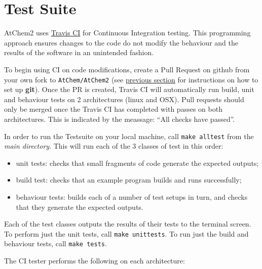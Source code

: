 \section{Test Suite} \label{sec:testsuite}

AtChem2 uses \href{https://travis-ci.org/}{Travis CI} for Continuous
Integration testing. This programming approach ensures changes to the
code do not modify the behaviour and the results of the software in an
unintended fashion.

To begin using CI on code modifications, create a Pull Request on
github from your own fork to \texttt{AtChem/AtChem2} (see
\hyperref[sec:information]{previous section} for instructions on how
to set up \textbf{git}). Once the PR is created, Travis CI will
automatically run build, unit and behaviour tests on 2 architectures
(linux and OSX). Pull requests should only be merged once the Travis
CI has completed with passes on both architectures. This is indicated
by the meassage: ``All checks have passed''.

In order to run the Testsuite on your local machine, call
\texttt{make\ alltest} from the \emph{main directory}. This will run
each of the 3 classes of test in this order:

\begin{itemize}
\item unit tests: checks that small fragments of code generate the
  expected outputs;
\item build test: checks that an example program builds and runs
  successfully;
\item behaviour tests: builds each of a number of test setups in turn,
  and checks that they generate the expected outputs.
\end{itemize}

Each of the test classes outputs the results of their tests to the
terminal screen. To perform just the unit tests, call \texttt{make\
  unittests}. To run just the build and behaviour tests, call
\texttt{make\ tests}.

The CI tester performs the following on each architecture:

